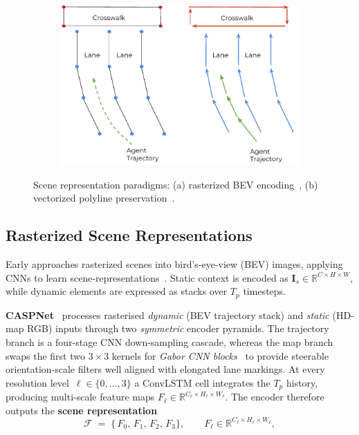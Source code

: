 \begin{figure}[H]
\begin{subfigure}[t]{0.35\textwidth}
\end{subfigure}
\hfill
\begin{subfigure}[t]{0.37\textwidth}
    \centering
    \includegraphics[width=\textwidth]{figures/vectornet-2020-vector-repr.pdf}
    \label{fig:vectorized}
\end{subfigure}
\caption{Scene representation paradigms: (a) rasterized BEV encoding~\cite{caspnetSchäfer2022}, (b) vectorized polyline preservation~\cite{gao2020vectornet}.}
\label{fig:scene_representations}
\end{figure}

\subsection{Rasterized Scene Representations}
Early approaches rasterized scenes into bird's-eye-view (BEV) images, applying CNNs to learn scene-representations~\cite{cui2019multimodal,chai2019multipath}. Static context is encoded as \(\mathbf{I}_s \in \mathbb{R}^{C \times H \times W}\), while dynamic elements are expressed as stacks over \(T_p\) timesteps.

\textbf{CASPNet}~\cite{caspnetSchäfer2022} processes rasterised \emph{dynamic} (BEV trajectory stack) and \emph{static} (HD-map RGB) inputs through two \emph{symmetric} encoder pyramids. The trajectory branch is a four-stage CNN down-sampling cascade, whereas the map branch swaps the first two \(3{\times}3\) kernels for \emph{Gabor CNN blocks}~\cite{jiang2017gabor} to provide steerable orientation-scale filters well aligned with elongated lane markings. At every resolution level~\(\ell\!\in\!\{0,\dots,3\}\) a ConvLSTM cell integrates the \(T_p\) history, producing multi-scale feature maps \(F_\ell\!\in\!\mathbb{R}^{C_\ell\times H_\ell\times W_\ell}\). The encoder therefore outputs the \textbf{scene representation}
\begin{equation}
\label{eq:caspnet_scene_repr}
\mathcal{F}
  \;=\;
  \bigl\{\,F_{0},\,F_{1},\,F_{2},\,F_{3}\bigr\},
\qquad
F_{\ell}\in\mathbb{R}^{C_{\ell}\times H_{\ell}\times W_{\ell}},
\end{equation}

